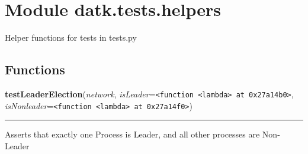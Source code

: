 %
%
%


\section{Module datk.tests.helpers}

    \label{datk:tests:helpers}
Helper functions for tests in tests.py



  \subsection{Functions}

    \label{datk:tests:helpers:testLeaderElection}

    \vspace{0.5ex}

\hspace{.8\funcindent}\begin{boxedminipage}{\funcwidth}

    \raggedright \textbf{testLeaderElection}(\textit{network}, \textit{isLeader}={\tt {\textless}function {\textless}lambda{\textgreater} at 0x27a14b0{\textgreater}}, \textit{isNonleader}={\tt {\textless}function {\textless}lambda{\textgreater} at 0x27a14f0{\textgreater}})

    \vspace{-1.5ex}

    \rule{\textwidth}{0.5\fboxrule}
\setlength{\parskip}{2ex}
    Asserts that exactly one Process is Leader, and all other processes are
    Non-Leader

\setlength{\parskip}{1ex}
    \end{boxedminipage}


